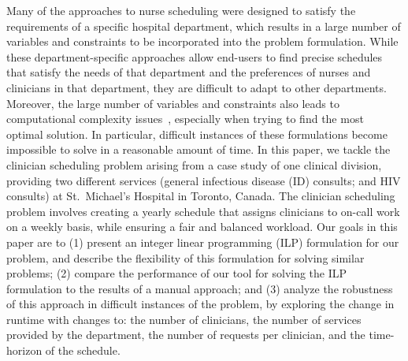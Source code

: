 Many of the approaches to nurse scheduling were designed to satisfy the
requirements of a specific hospital department, which results in a large number of
variables and constraints to be incorporated into the problem formulation. While
these department-specific approaches allow end-users to find precise schedules
that satisfy the needs of that department and the preferences of nurses and
clinicians in that department, they are difficult to adapt to other
departments. %
Moreover, the large number of variables and constraints also leads to
computational complexity issues~\cite{goos_complexity_1996}, especially when
trying to find the most optimal solution. In particular, difficult instances of these formulations
become impossible to solve in a reasonable amount of time. 
In this paper, we tackle the clinician 
scheduling problem arising from a case study of one clinical
division, providing two different services (general infectious
disease (ID) consults; and HIV consults) at St.\ Michael's Hospital in
Toronto, Canada. The clinician scheduling problem involves creating
a yearly schedule that assigns clinicians to on-call work on a weekly basis,
while ensuring a fair and balanced workload.
Our goals in this paper are to (1) present an integer linear programming 
(ILP) formulation for our problem, and
describe the flexibility of this formulation for solving similar problems;
(2) compare the performance of our tool for solving the ILP formulation to the
results of a manual approach; 
and (3) analyze the robustness of this approach
in difficult instances of the problem, by exploring the change in runtime with
changes to:
the number of clinicians,
the number of services provided by the department,
the number of requests per clinician, and
the time-horizon of the schedule.

